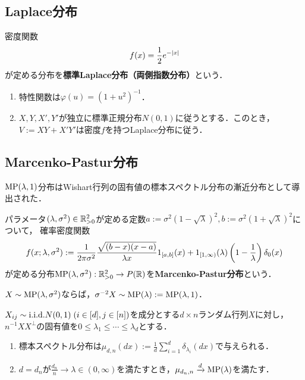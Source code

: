 \documentclass[uplatex,dvipdfmx]{jsreport}
\begin{document}
\subsection{Laplace分布}

\begin{definition}
    密度関数
    \[f(x)=\frac{1}{2}e^{-\lvert x\rvert}\]
    が定める分布を\textbf{標準Laplace分布（両側指数分布）}という．
\end{definition}

\begin{lemma}
    \begin{enumerate}
        \item 特性関数は$\varphi(u)=(1+u^2)^{-1}$．
        \item $X,Y,X',Y'$が独立に標準正規分布$N(0,1)$に従うとする．このとき，$V:=XY+X'Y'$は密度$f$を持つLaplace分布に従う．
    \end{enumerate}
\end{lemma}

\subsection{Marcenko-Pastur分布}

\begin{tcolorbox}[colframe=ForestGreen, colback=ForestGreen!10!white,breakable,colbacktitle=ForestGreen!40!white,coltitle=black,fonttitle=\bfseries\sffamily,
title=]
    $\mathrm{MP}(\lambda,1)$分布はWishart行列の固有値の標本スペクトル分布の漸近分布として導出された．
\end{tcolorbox}

\begin{definition}
    パラメータ$(\lambda,\sigma^2)\in\mathbb{R}^2_{>0}$が定める定数$a:=\sigma^2(1-\sqrt{\lambda})^2,b:=\sigma^2(1+\sqrt{\lambda})^2$について，
    確率密度関数
    \[f(x;\lambda,\sigma^2):=\frac{1}{2\pi\sigma^2}\frac{\sqrt{(b-x)(x-a)}}{\lambda x}1_{[a,b]}(x)+1_{[1,\infty)}(\lambda)\left(1-\frac{1}{\lambda}\right)\delta_0(x)\]
    が定める分布$\mathrm{MP}(\lambda,\sigma^2):\mathbb{R}_{>0}^2\to P(\mathbb{R})$を\textbf{Marcenko-Pastur分布}という．
\end{definition}

\begin{lemma}
    $X\sim\mathrm{MP}(\lambda,\sigma^2)$ならば，$\sigma^{-2}X\sim\mathrm{MP}(\lambda):=\mathrm{MP}(\lambda,1)$．
\end{lemma}

\begin{proposition}
    $X_{ij}\sim\mathrm{i.i.d.} N(0,1)\;(i\in[d],j\in[n])$を成分とする$d\times n$ランダム行列$X$に対し，$n^{-1}XX^\perp$の固有値を$0\le\lambda_1\le\cdots\le\lambda_d$とする．
    \begin{enumerate}
        \item 標本スペクトル分布は$\mu_{d,n}(dx):=\frac{1}{d}\sum^d_{i=1}\delta_{\lambda_i}(dx)$で与えられる．
        \item $d=d_n$が$\frac{d_n}{n}\to\lambda\in(0,\infty)$を満たすとき，$\mu_{d_n,n}\xrightarrow{d}\mathrm{MP}(\lambda)$を満たす．
    \end{enumerate}
\end{proposition}
\end{document}

